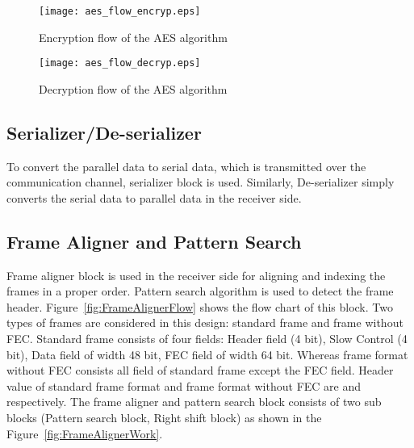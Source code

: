 \documentclass[a4paper]{jpconf}
\begin{document}
\begin{figure}[h]
\begin{minipage}{14pc}\texttt{[image: aes\_flow\_encryp.eps]}
\caption{\label{fig:aesencryption}Encryption flow of the AES algorithm}
\end{minipage}\hspace{7pc}\begin{minipage}{14pc}
\vspace{1pc}
\texttt{[image: aes\_flow\_decryp.eps]}
\caption{\label{fig:aesdecryption}Decryption flow of the AES algorithm}
\end{minipage} 
\end{figure}

\vspace{-1 pc}
\subsection{Serializer/De-serializer} To convert the parallel data to serial data, which is transmitted over the communication channel, serializer block is used. Similarly, De-serializer simply converts the serial data to parallel data in the receiver side.
\subsection{Frame Aligner and Pattern Search} \label{FrameAligner}
Frame aligner block is used in the receiver side for aligning and indexing the frames in a proper order. Pattern search algorithm is used to detect the frame header. Figure~\ref{fig:FrameAlignerFlow} shows the flow chart of this block. Two types of frames are considered in this design: standard frame and frame without FEC. Standard frame consists of four fields: Header field (4 bit), Slow Control (4 bit), Data field of width 48 bit, FEC field of width 64 bit. Whereas frame format without FEC consists all field of standard frame  except the FEC field. Header value of standard frame format and frame format without FEC are  and  respectively. The frame aligner and pattern search block consists of two sub blocks (Pattern search block, Right shift block) as shown in the Figure~\ref{fig:FrameAlignerWork}.
\end{document}
